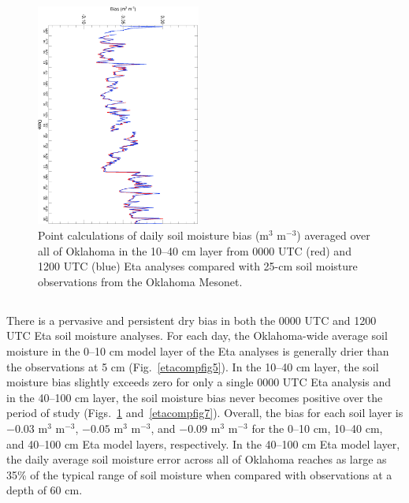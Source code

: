 \documentclass[twocolumn]{article}
\begin{document}
\begin{figure}[!t] %
\begin{center}
\includegraphics[angle=90, width=0.48\textwidth]{etacompfig6col}
\end{center}
\caption{
Point calculations of daily soil moisture bias (m$^3$ m$^{-3}$) averaged over all of Oklahoma in the 10--40 cm layer
from 0000 UTC (red) and 1200 UTC (blue) Eta analyses compared with 25-cm
soil moisture observations from the Oklahoma Mesonet.
\label{etacompfig6}
}
\end{figure}

\subsection{}
\label{etacomp_moist.sub}
There is a pervasive and persistent dry bias in both the 0000 UTC and 1200 UTC Eta soil moisture analyses.  For each day, the Oklahoma-wide average soil moisture in the 0--10 cm model layer of the Eta analyses is generally drier than the observations at 5 cm (Fig.~\ref{etacompfig5}).  In the 10--40 cm layer, the soil moisture bias slightly exceeds zero for only a single 0000 UTC Eta analysis and in the 40--100 cm layer, the soil moisture bias never becomes positive over the period of study (Figs.~\ref{etacompfig6} and~\ref{etacompfig7}).  Overall, the bias for each soil layer is $-0.03$ m$^3$ m$^{-3}$, $-0.05$ m$^3$ m$^{-3}$, and $-0.09$ m$^3$ m$^{-3}$ for the 0--10 cm, 10--40 cm, and 40--100 cm Eta model layers, respectively.  In the 40--100 cm Eta model layer, the daily average soil moisture error across all of Oklahoma reaches as large as 35\% of the typical range of soil moisture when compared with observations at a depth of 60 cm.
\end{document}
